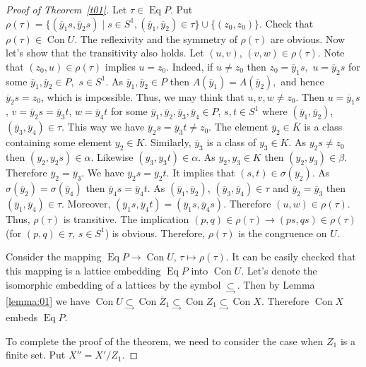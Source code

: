 \documentclass{birkau}
\numberwithin{equation}{section}
\theoremstyle{plain}
\theoremstyle{definition}
\DeclareMathOperator{\Con}{Con}
\DeclareMathOperator{\Eq}{Eq}
\begin{document}
\begin{proof}[Proof of Theorem~\ref{t01}]
        Let $\tau \in \Eq P.$ Put $\rho(\tau) = \{(\overline y_1s,\overline y_2s) \mid s\in S^1, (\overline y_1, \overline y_2)\in \tau\}\cup \{(z_0,z_0)\}.$ Check that $\rho(\tau)\in \Con U.$ The reflexivity and the symmetry of $\rho(\tau)$ are obvious. Now let's show that the transitivity also holds. Let $(u,v)$, $(v,w)\in \rho(\tau)$.
        Note that $(z_0,u) \in \rho(\tau)$ implies $u=z_0$. Indeed, if $u\ne z_0$ then $z_0=\overline y_1s,$ $u=\overline y_2s$ for some $\overline y_1, \overline y_2 \in P,$ $s\in S^1.$ As $\overline y_1, \overline y_2 \in P$ then $A(\overline y_1)=A(\overline y_2),$ and hence $\overline y_2s=z_0$, which is impossible.
        Thus, we may think that $u,v,w \ne z_0.$ Then $u=\overline y_1s$, $v=\overline y_2s=\overline y_3t$, $w=\overline y_4t$ for some $\overline y_1, \overline y_2, \overline y_3, \overline y_4 \in P$, $s,t\in S^1$ where $(\overline y_1, \overline y_2)$, $(\overline y_3, \overline y_4)\in \tau.$ This way we have $\overline y_2s=\overline y_3t \ne z_0.$ The element $\overline y_2 \in \overline K$ is a class containing some element $y_2\in K$. Similarly, $\overline y_3$ is a class of $y_3 \in K.$ As $y_2s\ne z_0$ then $(y_2,y_2s)\in\alpha$. Likewise $(y_3,y_3t)\in \alpha.$ As $y_2,y_3 \in K$ then $(y_2,y_3)\in \beta.$ Therefore $\overline y_2 =\overline y_3$. We have $\overline y_2s=\overline y_2t.$ It implies that $(s,t)\in \sigma (\overline y_2).$ As $\sigma(\overline y_2)=\sigma(\overline y_4)$ then $\overline y_4s=\overline y_4t.$ As $(\overline y_1, \overline y_2)$, $(\overline y_3, \overline y_4) \in \tau$ and $\overline y_2=\overline y_3$ then $(\overline y_1, \overline y_4) \in \tau$. Moreover, $(\overline y_1s, \overline y_4t)=(\overline y_1s, \overline y_4s)$. Therefore $(u,w)\in \rho(\tau)$. Thus, $\rho(\tau)$ is transitive. The implication $(p,q)\in \rho(\tau)\to (ps,qs) \in\rho(\tau)$ (for $(p,q)\in\tau$, $s\in S^1$) is obvious. Therefore, $\rho(\tau)$ is the congruence on $U$.

        Consider the mapping $\Eq P \to \Con U$, $\tau \mapsto \rho(\tau)$. It can be easily checked that this mapping is a lattice embedding $\Eq P$ into $\Con U$. Let's denote the isomorphic embedding of a lattices by the symbol $\underset\to \subset$. Then by Lemma \ref{lemma:01} we have $\Con U \underset \to \subset \Con \overline Z_1 \underset \to \subset \Con Z_1 \underset\to \subset \Con X$. Therefore $\Con X$ embeds $\Eq P$.
		
		To complete the proof of the theorem, we need to consider the case when $Z_1$ is a finite set. Put $X'' = X'/{Z_1}$.
		

\end{proof}
\end{document}
